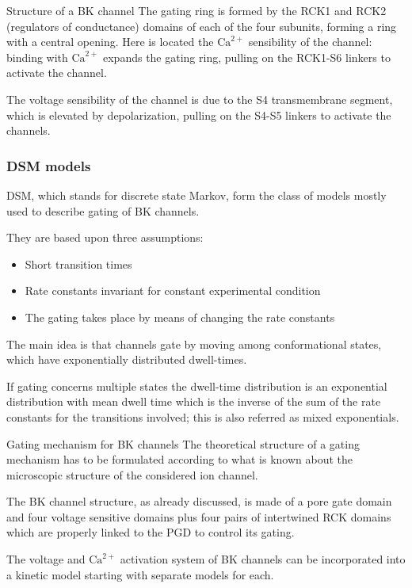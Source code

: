 \documentclass{beamer}
\newcommand{\ca}{\text{Ca}^{2+}}
\begin{document}
\begin{frame}{Structure of a BK channel}
The gating ring is formed by the RCK1 and RCK2 (regulators of conductance) domains of each of the four subunits, forming a ring with a central opening.
Here is located the $\ca$ sensibility of the channel: binding with $\ca$ expands the gating ring, pulling on the RCK1-S6 linkers to activate the channel.

The voltage sensibility of the channel is due to the S4 transmembrane segment, which is elevated by depolarization, pulling on the S4-S5 linkers to activate the channels.
\end{frame}

\begin{frame}[t]\frametitle{DSM models}
    DSM, which stands for discrete state Markov, form the class of models mostly used to describe gating of BK channels.

    They are based upon three assumptions:
    \begin{itemize}
    	\item Short transition times
    	\item Rate constants invariant for constant experimental condition
    	\item The gating takes place by means of changing the rate constants
    \end{itemize}
    The main idea is that channels gate by moving among conformational states, which have exponentially distributed dwell-times.

    If gating concerns multiple states the dwell-time distribution is an exponential distribution with mean dwell time which is the inverse of the sum of the rate constants for the transitions involved; this is also referred as mixed exponentials.

\end{frame}


\begin{frame}{Gating mechanism for BK channels}
The theoretical structure of a gating mechanism has to be formulated according to what is known about the microscopic structure of the considered ion channel.

The BK channel structure, as already discussed, is made of a pore gate domain and four voltage sensitive domains plus four pairs of intertwined RCK domains which are properly linked to the PGD to control its gating.

The voltage and $\ca$ activation system of BK channels can be incorporated into a kinetic model starting with separate models for each.

\end{frame}
\end{document}
